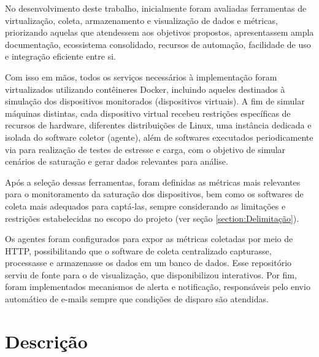 No desenvolvimento deste trabalho, inicialmente foram avaliadas ferramentas de virtualização, coleta, armazenamento e visualização de dados e métricas, priorizando aquelas que atendessem aos objetivos propostos, apresentassem ampla documentação, ecossistema consolidado, recursos de automação, facilidade de uso e integração eficiente entre si.

Com isso em mãos, todos os serviços necessários à implementação foram virtualizados utilizando contêineres Docker, incluindo aqueles destinados à simulação dos dispositivos monitorados (dispositivos virtuais). A fim de simular máquinas distintas, cada dispositivo virtual recebeu restrições específicas de recursos de hardware, diferentes distribuições de Linux, uma instância dedicada e isolada do software coletor (agente), além de softwares executados periodicamente via  para realização de testes de estresse e carga, com o objetivo de simular cenários de saturação e gerar dados relevantes para análise.

Após a seleção dessas ferramentas, foram definidas as métricas mais relevantes para o monitoramento da saturação dos dispositivos, bem como os softwares de coleta mais adequados para captá-las, sempre considerando as limitações e restrições estabelecidas no escopo do projeto (ver seção \ref{section:Delimitação}).

Os agentes foram configurados para expor as métricas coletadas por meio de  HTTP, possibilitando que o software de coleta centralizado capturasse, processasse e armazenasse os dados em um banco de dados. Esse repositório serviu de fonte para o  de visualização, que disponibilizou  interativos. Por fim, foram implementados mecanismos de alerta e notificação, responsáveis pelo envio automático de e-mails sempre que condições de disparo são atendidas.

\section{Descrição}

